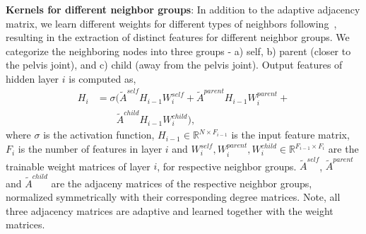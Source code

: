 \documentclass{article}
\begin{document}
\textbf{Kernels for different neighbor groups}: In addition to the adaptive adjacency matrix, we learn different weights for different types of neighbors following~\cite{Cai2019}, resulting in the extraction of distinct features for different neighbor groups.
We categorize the neighboring nodes into three groups - a) self, b) parent (closer to the pelvis joint), and c) child (away from the pelvis joint). 
Output features of hidden layer $i$ is computed as,
\begin{align}
H_i & = \sigma(\tilde{A}^{self}H_{i-1}W^{self}_{i} + \tilde{A}^{parent}H_{i-1}W^{parent}_{i} + \nonumber \\
&\qquad\tilde{A}^{child}H_{i-1}W^{child}_{i}),
\label{eq:split_kernels}
\end{align}
where $\sigma$ is the activation function, $H_{i-1} \in \mathbb{R}^{N \times F_{i-1}}$ is the input feature matrix, $F_i$ is the number of features in layer $i$ and $W_i^{self},W_i^{parent},W_i^{child} \in \mathbb{R}^{F_{i-1} \times F_{i}}$ are the trainable weight matrices of layer $i$, for respective neighbor groups.
$\tilde{A}^{self}$, $\tilde{A}^{parent}$ and $\tilde{A}^{child}$ are the adjaceny matrices of the respective neighbor groups, normalized symmetrically with their corresponding degree matrices.
Note, all three adjacency matrices are adaptive and learned together with the weight matrices. 

\begin{table*}[t]
\centering
{}
\caption{\label{tab:mpjpe-joint}Mean Per Joint Position Error (MPJPE) (Protocol \#1) in millimeter between predicted and ground-truth poses on Human 3.~6m Dataset at joint level, in increasing order. The last column reports the average error. }
\end{table*}
\end{document}
